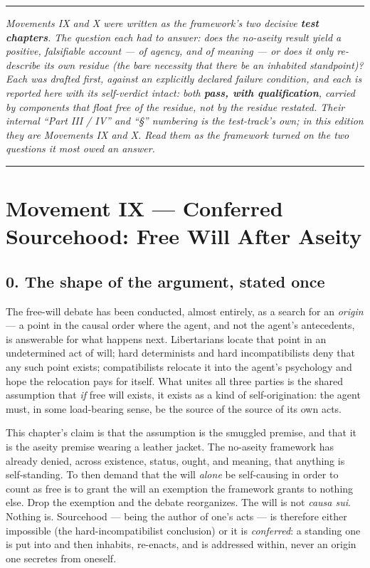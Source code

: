 \documentclass[11pt]{article}
\begin{document}
\medskip\noindent\rule{\linewidth}{0.3pt}\medskip

\emph{Movements IX and X were written as the framework's two decisive \textbf{test chapters}. The question each had to answer: does the no-aseity result yield a positive, falsifiable account — of agency, and of meaning — or does it only re-describe its own residue (the bare necessity that there be an inhabited standpoint)? Each was drafted first, against an explicitly declared failure condition, and each is reported here with its self-verdict intact: both \textbf{pass, with qualification}, carried by components that float free of the residue, not by the residue restated. Their internal ``Part III /\allowbreak{} IV'' and ``§'' numbering is the test-track's own; in this edition they are Movements IX and X. Read them as the framework turned on the two questions it most owed an answer.}

\medskip\noindent\rule{\linewidth}{0.3pt}\medskip

\section*{Movement IX — Conferred Sourcehood: Free Will After Aseity}

\subsection*{0. The shape of the argument, stated once}

The free-will debate has been conducted, almost entirely, as a search for an \emph{origin} — a point in the causal order where the agent, and not the agent's antecedents, is answerable for what happens next. Libertarians locate that point in an undetermined act of will; hard determinists and hard incompatibilists deny that any such point exists; compatibilists relocate it into the agent's psychology and hope the relocation pays for itself. What unites all three parties is the shared assumption that \emph{if} free will exists, it exists as a kind of self-origination: the agent must, in some load-bearing sense, be the source of the source of its own acts.

This chapter's claim is that the assumption is the smuggled premise, and that it is the aseity premise wearing a leather jacket. The no-aseity framework has already denied, across existence, status, ought, and meaning, that anything is self-standing. To then demand that the will \emph{alone} be self-causing in order to count as free is to grant the will an exemption the framework grants to nothing else. Drop the exemption and the debate reorganizes. The will is not \emph{causa sui}. Nothing is. Sourcehood — being the author of one's acts — is therefore either impossible (the hard-incompatibilist conclusion) or it is \emph{conferred}: a standing one is put into and then inhabits, re-enacts, and is addressed within, never an origin one secretes from oneself.
\end{document}
